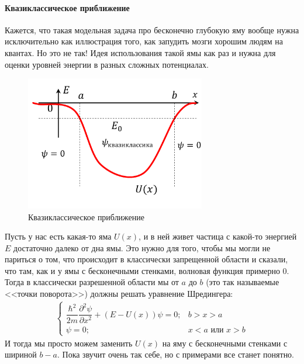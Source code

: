 \documentclass[12pt]{article}
\begin{document}
\paragraph{Квазиклассическое приближение}
Кажется, что такая модельная задача про бесконечно глубокую яму вообще нужна исключительно как иллюстрация того, как запудить мозги хорошим людям на квантах. Но это не так! Идея использования такой ямы как раз и нужна для оценки уровней энергии в разных сложных потенциалах.
\begin{figure}[h]
    \centering
    \includegraphics[width=0.7\textwidth,height=\textheight,keepaspectratio]{Seminar_04/pics/pic_04.pdf}
    \caption{Квазиклассическое приближение}
\end{figure}
Пусть у нас есть какая-то яма $U(x)$, и в ней живет частица с какой-то энергией $E$ достаточно далеко от дна ямы. Это нужно для того, чтобы мы могли не париться о том, что происходит в классически запрещенной области и сказали, что там, как и у ямы с бесконечными стенками, волновая функция примерно 0. Тогда в классически разрешенной области мы от $a$ до $b$ (это так называемые <<точки поворота>>) должны решать уравнение Шредингера:
\begin{gather*}
    \begin{cases}
         \dfrac{\hbar^2}{2m}\dfrac{\partial^2\psi}{\partial x^2} +  (E-U(x))\psi=0; &b>x>a  \\[10pt]
         \psi=0;  &x<a \text{ или } x>b 
    \end{cases}
\end{gather*}
И тогда мы просто можем заменить $U(x)$ на яму с бесконечными стенками с шириной $b-a$. Пока звучит очень так себе, но с примерами все станет понятно.
\end{document}
